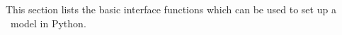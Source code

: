 \documentclass[11pt,a4paper]{book} %
\begin{document}
\newpage

\pagestyle{plain}
%
\tableofcontents


\clearpage
{} 
\setcounter{page}{0}









This section lists the basic interface functions which can be used to set up a \codeName\ model in Python.
\end{document}
